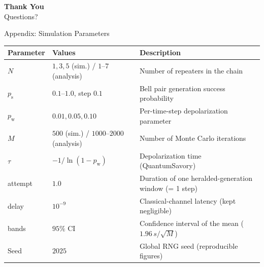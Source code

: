 \documentclass[aspectratio=169, 11pt]{beamer}
\newcommand{\pw}{p_{\mathrm{w}}}
\newcommand{\ps}{p_{\mathrm{s}}}
\begin{document}
\appendix

\begin{frame}
  \centering
  \vfill
  {\color{white}\Huge\bfseries Thank You}\\[1em]
  {\color{qCyan}\large Questions?}
  \vfill
\end{frame}

\begin{frame}[noframenumbering]{Appendix: Simulation Parameters}
  \centering
  \footnotesize
  \renewcommand{\arraystretch}{1.2}
  \begin{tabular}{l p{3.2cm} p{6.0cm}}
    \toprule
    \textbf{Parameter} & \textbf{Values} & \textbf{Description} \\
    \midrule
    $N$ & $1, 3, 5$ (sim.) / $1$--$7$ (analysis) & Number of repeaters in the chain \\
    $\ps$ & $0.1$--$1.0$, step $0.1$ & Bell pair generation success probability \\
    $\pw$ & $0.01, 0.05, 0.10$ & Per-time-step depolarization parameter \\
    $M$ & $500$ (sim.) / $1000$--$2000$ (analysis) & Number of Monte Carlo iterations \\
    $\tau$ & $-1/\ln(1 - \pw)$ & Depolarization time (QuantumSavory) \\
    attempt & $1.0$ & Duration of one heralded-generation window (= 1 step) \\
    delay & $10^{-9}$ & Classical-channel latency (kept negligible) \\
    bands & $95\%$ CI & Confidence interval of the mean ($1.96\,s/\sqrt{M}$) \\
    Seed & $2025$ & Global RNG seed (reproducible figures) \\
    \bottomrule
  \end{tabular}
\end{frame}
\end{document}

